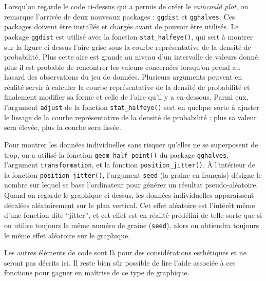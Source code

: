 \documentclass[
  french,
]{book}
\begin{document}
Lorsqu'on regarde le code ci-dessus qui a permis de créer le \emph{raincould plot}, on remarque l'arrivée de deux nouveaux packages : \texttt{ggdist} et \texttt{gghalves}. Ces packages doivent être installés et chargés avant de pouvoir être utilisés. Le package \texttt{ggdist} est utilisé avec la fonction \texttt{stat\_halfeye()}, qui sert à montrer sur la figure ci-dessus l'aire grise sous la courbe représentative de la densité de probabilité. Plus cette aire est grande au niveau d'un intervalle de valeurs donné, plus il est probable de rencontrer les valeurs concernées lorsqu'on prend au hasard des observations du jeu de données. Plusieurs arguments peuvent en réalité servir à calculer la courbe représentative de la densité de probabilité et finalement modifier sa forme et celle de l'aire qu'il y a en-dessous. Parmi eux, l'argument \texttt{adjust} de la fonction \texttt{stat\_halfeye()} sert en quelque sorte à ajuster le lissage de la courbe représentative de la densité de probabilité : plus sa valeur sera élevée, plus la courbe sera lissée.

Pour montrer les données individuelles sans risquer qu'elles ne se superposent de trop, on a utilisé la fonction \texttt{geom\_half\_point()} du package \texttt{gghalves}, l'argument \texttt{transformation}, et la fonction \texttt{position\_jitter()}. À l'intérieur de la fonction \texttt{position\_jitter()}, l'argument \texttt{seed} (la graine en français) désigne le nombre sur lequel se base l'ordinateur pour générer un résultat pseudo-aléatoire. Quand on regarde le graphique ci-dessus, les données individuelles apparaissent décalées aléatoirement sur le plan vertical. Cet effet aléatoire est l'intérêt même d'une fonction dite \enquote{jitter}, et cet effet est en réalité prédéfini de telle sorte que si on utilise toujours le même numéro de graine (\texttt{seed}), alors on obtiendra toujours le même effet aléatoire sur le graphique.

Les autres éléments de code sont là pour des considérations esthétiques et ne seront pas décrits ici. Il reste bien sûr possible de lire l'aide associée à ces fonctions pour gagner en maîtrise de ce type de graphique.
\end{document}
